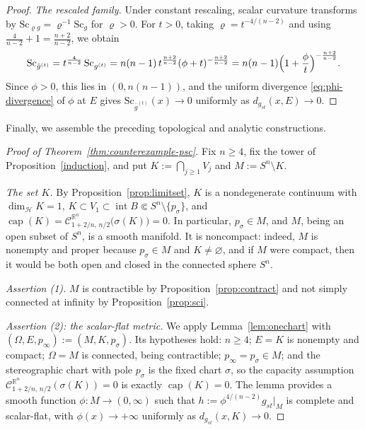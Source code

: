 \documentclass[12pt,oneside,a4paper]{article}
\theoremstyle{mytheorem}
\theoremstyle{remark}
\theoremstyle{definition}
\begin{document}
\begin{proof}
\emph{The rescaled family.}
Under constant rescaling, scalar curvature transforms by
$\mathrm{Sc}_{\varrho g}=\varrho^{-1}\mathrm{Sc}_g$ for $\varrho>0$.  For
$t>0$, taking $\varrho=t^{-4/(n-2)}$ and using
$\frac4{n-2}+1=\frac{n+2}{n-2}$, we obtain
\[
 \mathrm{Sc}_{\bar g^{(t)}}
 =t^{\frac4{n-2}}\,\mathrm{Sc}_{g^{(t)}}
 =n(n-1)\,t^{\frac{n+2}{n-2}}(\phi+t)^{-\frac{n+2}{n-2}}
 =n(n-1)\Bigl(1+\frac{\phi}{t}\Bigr)^{-\frac{n+2}{n-2}}.
\]
Since $\phi>0$, this lies in $(0,n(n-1))$, and the uniform divergence
\eqref{eq:phi-divergence} of $\phi$ at $E$ gives
$\mathrm{Sc}_{\bar g^{(t)}}(x)\to0$ uniformly as
$d_{g_{st}}(x,E)\to0$.
\end{proof}

Finally, we assemble the preceding topological and analytic
constructions.


\begin{proof}[Proof of Theorem~\ref{thm:counterexample-psc}]
Fix $n\ge4$, fix the tower of Proposition~\ref{induction}, and put
$K:=\bigcap_{j\ge1}V_j$ and $M:=S^n\setminus K$.

\smallskip\noindent\emph{The set $K$.}
By Proposition~\ref{prop:limitset}, $K$ is a nondegenerate continuum
with $\dim_{\mathcal{H}}K=1$,
$K\subset V_1\subset\operatorname{int}B\Subset S^n\setminus\{p_\sigma\}$, and
$\operatorname{cap}(K)=
\mathcal{C}_{1+2/n,\,n/2}^{\mathbb R^n}\bigl(\sigma(K)\bigr)=0.$
In particular, $p_\sigma\in M$, and $M$, being an open subset of $S^n$,
is a smooth manifold.  It is noncompact: indeed, $M$ is nonempty and
proper because $p_\sigma\in M$ and $K\neq\varnothing$, and if $M$ were compact,
then it would be both open and closed in the connected sphere $S^n$.

\smallskip\noindent\emph{Assertion (1).}
$M$ is contractible by Proposition~\ref{prop:contract} and not simply
connected at infinity by Proposition~\ref{prop:sci}.

\smallskip\noindent\emph{Assertion (2): the scalar-flat metric.}
We apply Lemma~\ref{lem:onechart} with
$(\Omega,E,p_\infty):=(M,K,p_\sigma)$.  Its
hypotheses hold: $n\ge4$; $E=K$ is nonempty and compact; $\Omega=M$ is
connected, being contractible; $p_\infty=p_\sigma\in M$; and the
stereographic chart with pole $p_\sigma$ is the fixed chart $\sigma$, so the
capacity assumption
$\mathcal{C}_{1+2/n,\,n/2}^{\mathbb R^n}(\sigma(K))=0$ is exactly
$\operatorname{cap}(K)=0$.  The lemma provides a smooth function
$\phi:M\to(0,\infty)$ such that $h:=\phi^{4/(n-2)}g_{st}|_M$ is
complete and scalar-flat, with $\phi(x)\to+\infty$ uniformly as
$d_{g_{st}}(x,K)\to0$.


\end{proof}
\end{document}
